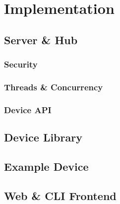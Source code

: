 \chapter{Implementation} \label{cha:chapter2}

\section{Server \& Hub} \label{sec:chap3:server}
\subsection{Security} \label{sec:chap3:server:security}

\subsection{Threads \& Concurrency} \label{sec:chap3:server:threads}

\subsection{Device API} \label{sec:chap3:server:api}

\section{Device Library} \label{sec:chap3:devicelib}
\section{Example Device} \label{sec:chap3:deviceexample}
\section{Web \& CLI Frontend} \label{sec:chap3:frontend}
